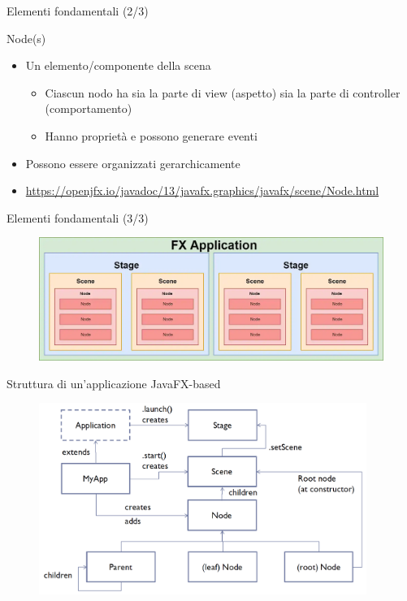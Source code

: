 \documentclass[presentation]{beamer}
\begin{document}
\begin{frame} {Elementi fondamentali (2/3)}
\begin{block}{Node(s)}
\begin{itemize}
\item Un elemento/componente della scena
\begin{itemize}
\item Ciascun nodo ha sia la parte di view (aspetto) sia la parte di controller (comportamento)
\item Hanno proprietà e possono generare eventi
\end{itemize}
\item Possono essere organizzati gerarchicamente
\item \url{https://openjfx.io/javadoc/13/javafx.graphics/javafx/scene/Node.html}
\end{itemize}
\end{block}
\end{frame}

\begin{frame}{Elementi fondamentali (3/3)}
\begin{figure}
\includegraphics[width=\textwidth]{img/javafx-app.png}
\end{figure}
\end{frame}

%

\begin{frame}{Struttura di un'applicazione JavaFX-based}
\begin{figure}
\includegraphics[width=0.95\textwidth]{img/javafx-app-arch.png}
\end{figure}
\end{frame}
\end{document}
